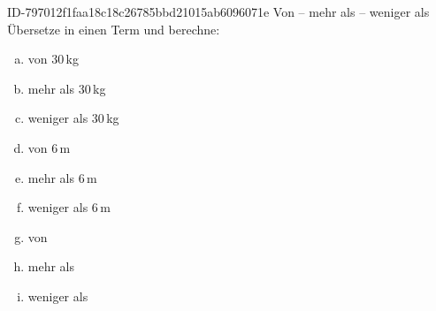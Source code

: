 \begin{exercise}
      {ID-797012f1faa18c18c26785bbd21015ab6096071e}
      {Von -- mehr als -- weniger als}
  \ifproblem\problem
    Übersetze in einen Term und berechne:\\
    \begin{minipage}[t]{0.32\textwidth}
      \begin{enumerate}[a)]
        \item {} von 30\,kg
        \item {} mehr als 30\,kg
        \item {} weniger als 30\,kg
      \end{enumerate}
    \end{minipage}%
    \hfill
    \begin{minipage}[t]{0.32\textwidth}
      \begin{enumerate}[a)]
        \setcounter{enumi}{3}
        \item {} von 6\,m
        \item {} mehr als 6\,m
        \item {} weniger als 6\,m
      \end{enumerate}
    \end{minipage}%
    \hfill
    \begin{minipage}[t]{0.32\textwidth}
      \begin{enumerate}[a)]
        \setcounter{enumi}{6}
        \item {} von 
        \item {} mehr als 
        \item {} weniger als 
      \end{enumerate}
    \end{minipage}
  \fi
\end{exercise}
